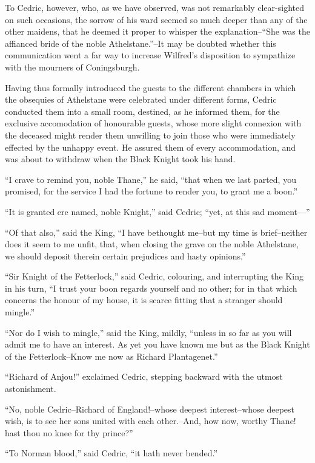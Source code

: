 To Cedric, however, who, as we have observed, was not remarkably
clear-sighted on such occasions, the sorrow of his ward seemed so much
deeper than any of the other maidens, that he deemed it proper to
whisper the explanation--``She was the affianced bride of the noble
Athelstane.''--It may be doubted whether this communication went a far
way to increase Wilfred's disposition to sympathize with the mourners of
Coningsburgh.

Having thus formally introduced the guests to the different chambers in
which the obsequies of Athelstane were celebrated under different forms,
Cedric conducted them into a small room, destined, as he informed them,
for the exclusive accomodation of honourable guests, whose more slight
connexion with the deceased might render them unwilling to join those
who were immediately effected by the unhappy event. He assured them of
every accommodation, and was about to withdraw when the Black Knight
took his hand.

``I crave to remind you, noble Thane,'' he said, ``that when we last
parted, you promised, for the service I had the fortune to render you,
to grant me a boon.''

``It is granted ere named, noble Knight,'' said Cedric; ``yet, at this
sad moment---''

``Of that also,'' said the King, ``I have bethought me--but my time is
brief--neither does it seem to me unfit, that, when closing the grave on
the noble Athelstane, we should deposit therein certain prejudices and
hasty opinions.''

``Sir Knight of the Fetterlock,'' said Cedric, colouring, and
interrupting the King in his turn, ``I trust your boon regards yourself
and no other; for in that which concerns the honour of my house, it is
scarce fitting that a stranger should mingle.''

``Nor do I wish to mingle,'' said the King, mildly, ``unless in so far
as you will admit me to have an interest. As yet you have known me but
as the Black Knight of the Fetterlock--Know me now as Richard
Plantagenet.''

``Richard of Anjou!'' exclaimed Cedric, stepping backward with the
utmost astonishment.

``No, noble Cedric--Richard of England!--whose deepest interest--whose
deepest wish, is to see her sons united with each other.--And, how now,
worthy Thane! hast thou no knee for thy prince?''

``To Norman blood,'' said Cedric, ``it hath never bended.''

